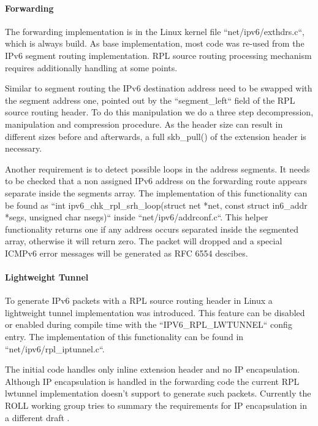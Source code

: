 \documentclass[letterpaper]{article}
\begin{document}
\paragraph{Forwarding}

The forwarding implementation is in the Linux kernel file
``net/ipv6/exthdrs.c``, which is always build.
As base implementation, most code was re-used from the IPv6 segment routing implementation.
RPL source routing processing mechanism requires additionally handling at some points.

Similar to segment routing the IPv6 destination address need to be swapped with the segment address one, pointed out by the ``segment\_left`` field of the RPL source routing header.
To do this manipulation we do a three step decompression, manipulation and
compression  procedure.
As the header size can result in different sizes before and afterwards, a full skb\_pull() of the extension header is necessary.

Another requirement is to detect possible loops in the address segments.
It needs to be checked that a non assigned IPv6 address on the forwarding route appears separate inside the segments array.
The implementation of this functionality can be found as ``int ipv6\_chk\_rpl\_srh\_loop(struct net *net, const struct in6\_addr *segs, unsigned char nsegs)`` inside ``net/ipv6/addrconf.c``.
This helper functionality returns one if any address occurs separated inside the segmented array, otherwise it will return zero.
The packet will dropped and a special ICMPv6 error messages will be generated as RFC 6554 descibes.

\paragraph{Lightweight Tunnel}

To generate IPv6 packets with a RPL source routing header in Linux a lightweight tunnel implementation was introduced.
This feature can be disabled or enabled during compile time with the ``IPV6\_RPL\_LWTUNNEL`` config entry.
The implementation of this functionality can be found in ``net/ipv6/rpl\_iptunnel.c``.

The initial code handles only inline extension header and no IP encapsulation.
Although IP encapsulation is handled in the forwarding code the current RPL lwtunnel implementation doesn't support to generate such packets.
Currently the ROLL working group tries to summary the requirements for IP
encapsulation in a different draft \cite{I-D.ietf-roll-useofrplinfo}.
\end{document}
